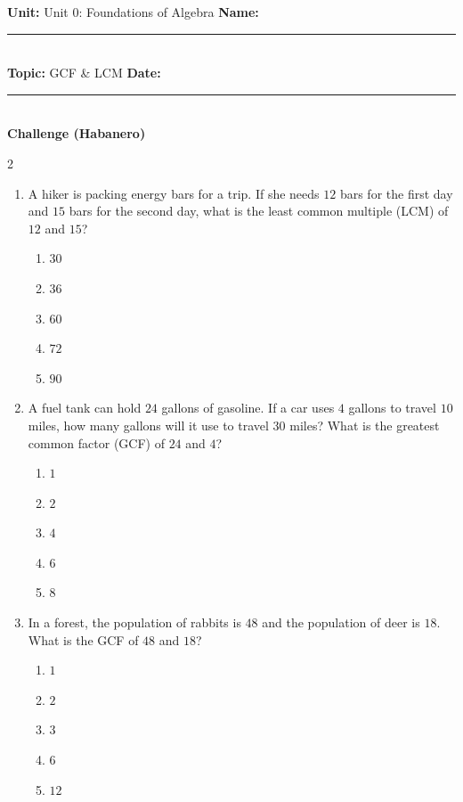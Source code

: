 \documentclass[10pt]{article}
\begin{document}
\enlargethispage{2.5cm}

\begin{tcolorbox}[colback=mainblue!5, colframe=mainblue, sharp corners, boxrule=0.5pt]
    \small \textbf{Unit:} Unit 0: Foundations of Algebra \hfill \textbf{Name:} \rule{3cm}{0.4pt} \\
    \small \textbf{Topic:} GCF & LCM \hfill \textbf{Date:} \rule{2cm}{0.4pt} \\
    \centering \textbf{\large Challenge (Habanero)}
\end{tcolorbox}

\vspace{0.2cm}

\begin{multicols}{2}
\begin{enumerate}[label=\textbf{Q\arabic*.}, leftmargin=*, itemsep=6pt, parsep=0pt]

  \item \small A hiker is packing energy bars for a trip. If she needs $12$ bars for the first day and $15$ bars for the second day, what is the least common multiple (LCM) of $12$ and $15$?
  \begin{enumerate}[label=(\Alph*), leftmargin=0.6cm, nosep, itemsep=2pt]
    \item $30$
    \item $36$
    \item $60$
    \item $72$
    \item $90$
  \end{enumerate}

  \item \small A fuel tank can hold $24$ gallons of gasoline. If a car uses $4$ gallons to travel $10$ miles, how many gallons will it use to travel $30$ miles? What is the greatest common factor (GCF) of $24$ and $4$?
  \begin{enumerate}[label=(\Alph*), leftmargin=0.6cm, nosep, itemsep=2pt]
    \item $1$
    \item $2$
    \item $4$
    \item $6$
    \item $8$
  \end{enumerate}

  \item \small In a forest, the population of rabbits is $48$ and the population of deer is $18$. What is the GCF of $48$ and $18$?
  \begin{enumerate}[label=(\Alph*), leftmargin=0.6cm, nosep, itemsep=2pt]
    \item $1$
    \item $2$
    \item $3$
    \item $6$
    \item $12$
  \end{enumerate}


\end{enumerate}
\end{multicols}
\end{document}
